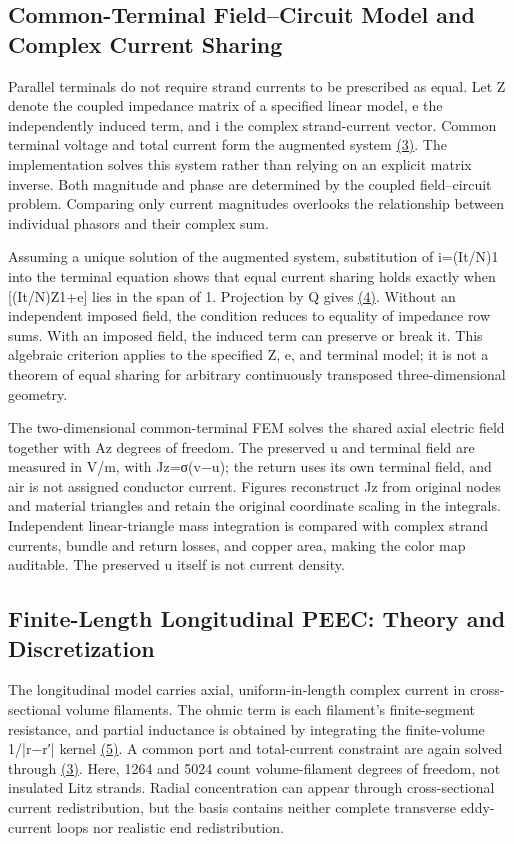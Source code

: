 \documentclass[journal,10pt]{IEEEtran}
\begin{document}
\subsection*{Common-Terminal Field–Circuit Model and Complex Current Sharing}
\hypertarget{02.common.heading}{}
Parallel terminals do not require strand currents to be prescribed as equal. Let Z denote the coupled impedance matrix of a specified linear model, e the independently induced term, and i the complex strand-current vector. Common terminal voltage and total current form the augmented system \href{paper_en_ieee.pdf#E04}{(3)}. The implementation solves this system rather than relying on an explicit matrix inverse. Both magnitude and phase are determined by the coupled field–circuit problem. Comparing only current magnitudes overlooks the relationship between individual phasors and their complex sum.


Assuming a unique solution of the augmented system, substitution of i=(It/N)1 into the terminal equation shows that equal current sharing holds exactly when [(It/N)Z1+e] lies in the span of 1. Projection by Q gives \href{paper_en_ieee.pdf#E05}{(4)}. Without an independent imposed field, the condition reduces to equality of impedance row sums. With an imposed field, the induced term can preserve or break it. This algebraic criterion applies to the specified Z, e, and terminal model; it is not a theorem of equal sharing for arbitrary continuously transposed three-dimensional geometry.


The two-dimensional common-terminal FEM solves the shared axial electric field together with Az degrees of freedom. The preserved u and terminal field are measured in V/m, with Jz=σ(v−u); the return uses its own terminal field, and air is not assigned conductor current. Figures reconstruct Jz from original nodes and material triangles and retain the original coordinate scaling in the integrals. Independent linear-triangle mass integration is compared with complex strand currents, bundle and return losses, and copper area, making the color map auditable. The preserved u itself is not current density.


\subsection*{Finite-Length Longitudinal PEEC: Theory and Discretization}
\hypertarget{02.peec_method.heading}{}
The longitudinal model carries axial, uniform-in-length complex current in cross-sectional volume filaments. The ohmic term is each filament’s finite-segment resistance, and partial inductance is obtained by integrating the finite-volume 1/|r−r′| kernel \href{paper_en_ieee.pdf#E08}{(5)}. A common port and total-current constraint are again solved through \href{paper_en_ieee.pdf#E04}{(3)}. Here, 1264 and 5024 count volume-filament degrees of freedom, not insulated Litz strands. Radial concentration can appear through cross-sectional current redistribution, but the basis contains neither complete transverse eddy-current loops nor realistic end redistribution.
\end{document}
